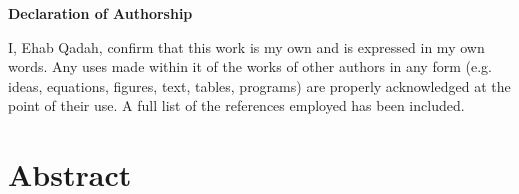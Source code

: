 \documentclass[12pt, %
a4paper, %
twoside, %
openright, %
abstract=on, %
DIV=11,      %
BCOR=8mm,openright]{scrbook}
\begin{document}
	\frontmatter
	
	

	\vspace{4cm}
	
	
	\thispagestyle{empty}
	{\noindent%
		\huge{\textbf{\textsf{Declaration of Authorship}}}
	}
	\vspace{2cm}
	\begin{flushleft}
		\noindent%
		I, Ehab Qadah, confirm that this work is my own and is expressed in my own words. Any
		uses made within it of the works of other authors in any form (e.g. ideas, equations, figures,
		text, tables, programs) are properly acknowledged at the point of their use. A full list of the
		references employed has been included.
	\end{flushleft}
	
	

	\chapter*{Abstract}
	\thispagestyle{empty}
    
    
	
	\tableofcontents
	\thispagestyle{empty}
	\listoffigures
	
	\mainmatter
	
	
	
	
	
	
	
	

	
	
	
	
	\FloatBarrier
	
	
	 
\end{document}
